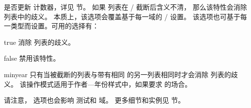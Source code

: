 \begin{optionlist}
是否更新  计数器，详见  节。
如果  列表在 \slash {} 截断后含义不清，
那么该特性会消除  列表中的歧义。
本质上，该选项会覆盖基于每一域的 \slash {} 设置。
该选项也可基于每一类型而设置。可用的选择有：

\begin{valuelist}
\item[true] %
消除  列表的歧义。
\item[false] %
禁用该特性。
\item[minyear] %
只有当被截断的列表与带有相同  的另一列表相同时才会消除  列表的歧义。
该操作模式适用于作者---年份样式中，如果要求  的场合。
\end{valuelist}
%
请注意， 选项也会影响  测试和  域。
更多细节和实例见  节。

\end{optionlist}

